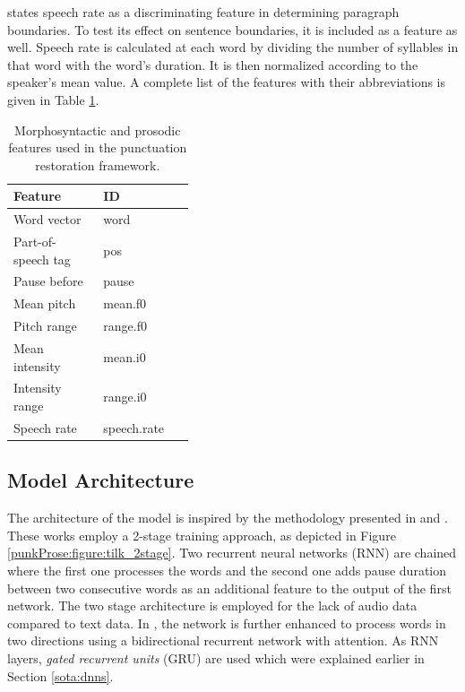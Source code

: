 \cite{Farrus:SP:2016} states speech rate as a discriminating feature in determining paragraph boundaries. To test its effect on sentence boundaries, it is included as a feature as well. Speech rate is calculated at each word by dividing the number of syllables in that word with the word's duration. It is then normalized according to the speaker's mean value. 
A complete list of the features with their abbreviations is given in Table \ref{punkProse:table:features}.

\begin{table}[th]
  \centering
  \begin{tabular}{>{\arraybackslash} m{0.25\linewidth} | >{\arraybackslash} m{0.15\linewidth} }
    \toprule
    \textbf{Feature} & \textbf{ID} \\
    \midrule
    Word vector                 & word                  \\
    Part-of-speech tag			& pos				  \\
    Pause before                & pause                     \\
    Mean pitch                  & mean.f0                    \\
    Pitch range                 & range.f0          \\
    Mean intensity              & mean.i0               \\
    Intensity range             & range.i0                   \\
    Speech rate                 & speech.rate       \\
    \bottomrule
  \end{tabular}
  \caption{Morphosyntactic and prosodic features used in the punctuation restoration framework.}
  \label{punkProse:table:features}
\end{table}

\subsection{Model Architecture}
\label{punkProse:methodology:model}
The architecture of the model is inspired by the methodology presented in \cite{tilk2015lstm} and \cite{tilk2016bidirectional}. These works employ a 2-stage training approach, as depicted in Figure \ref{punkProse:figure:tilk_2stage}. Two recurrent neural networks (RNN) are chained where the first one processes the words and the second one adds pause duration between two consecutive words as an additional feature to the output of the first network. The two stage architecture is employed for the lack of audio data compared to text data. In \cite{tilk2016bidirectional}, the network is further enhanced to process words in two directions using a bidirectional recurrent network \citep{brnn} with attention. As RNN layers, \textit{gated recurrent units} (GRU) are used \citep{gru} which were explained earlier in Section \ref{sota:dnns}. 

